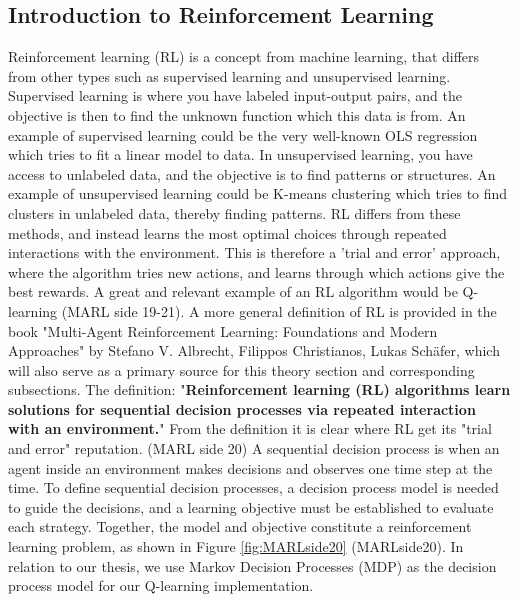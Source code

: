 \documentclass{article}
\begin{document}
\subsection{Introduction to Reinforcement Learning}
Reinforcement learning (RL) is a concept from machine learning, that differs from other types such as supervised learning and unsupervised learning.
Supervised learning is where you have labeled input-output pairs, and the objective is then to find the unknown function which this data is from. An example of supervised learning could be the very well-known OLS regression which tries to fit a linear model to data. In unsupervised learning, you have access to unlabeled data, and the objective is to find patterns or structures. An example of unsupervised learning could be K-means clustering which tries to find clusters in unlabeled data, thereby finding patterns. RL differs from these methods, and instead learns the most optimal choices through repeated interactions with the environment. This is therefore a 'trial and error' approach, where the algorithm tries new actions, and learns through which actions give the best rewards. A great and relevant example of an RL algorithm would be Q-learning (MARL side 19-21). \citep[p. 19-21]{MARLBOOK}
\newline 
\newline
A more general definition of RL is provided in the book "Multi-Agent Reinforcement Learning:
Foundations and Modern Approaches" by Stefano V. Albrecht,  Filippos Christianos,  Lukas Schäfer, which will also serve as a primary source for this theory section and corresponding subsections. The definition: 
"\textbf{Reinforcement learning (RL) algorithms learn solutions for sequential
decision processes via repeated interaction with an environment.}"
From the definition it is clear where RL get its "trial and error" reputation.   
\newline
(MARL side 20)
\newline
\newline
A sequential decision process is when an agent inside an environment makes decisions and observes one time step at the time. To define sequential decision processes, a decision process model is needed to guide the decisions, and a learning objective must be established to evaluate each strategy. Together, the model and objective constitute a reinforcement learning problem, as shown in Figure \ref{fig:MARLside20} (MARLside20). In relation to our thesis, we use Markov Decision Processes (MDP) as the decision process model for our Q-learning implementation.
\end{document}
